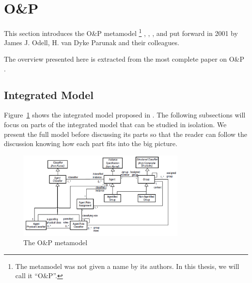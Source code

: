 
\section{O\&P}

This section introduces the O\&P metamodel
\footnote{The metamodel was not given a name by its authors. In this thesis, we will call it ``O\&P''.}
\cite{Odell01}, \cite{Parunak02}, \cite{Odell03b}, \cite{Odell04b} and \cite{Odell05}
put forward in 2001 by James J. Odell, H. van Dyke Parunak and their colleagues.

The overview presented here is extracted from the most complete paper on O\&P \cite{Odell05}.

\subsection{Integrated Model}

Figure~\ref{figure:onp-metamodel} shows the integrated model proposed in \cite{Odell05}.
The following subsections will focus on parts of the integrated model that can be studied in isolation.
We present the full model before discussing its parts so that the reader can follow the discussion knowing how each part fits into the big picture.

\begin{figure}[ht]
	\centering
	\includegraphics[width=0.75\textwidth]{images/onp/onp-metamodel.png}
	\caption{The O\&P metamodel \cite{Odell05}}
	\label{figure:onp-metamodel}
\end{figure}

